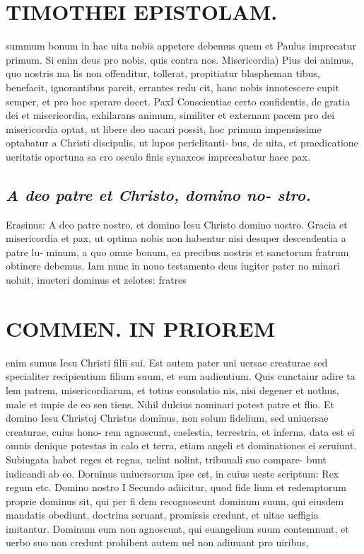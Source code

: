 \documentclass{article}
\begin{document}
\begin{pages}
\section*{TIMOTHEI EPISTOLAM. }
\marginpar{[ p.9 ]}\pstart summum bonum in hac uita nobis appetere debemus quem et Paulus imprecatur primum. Si enim deus pro nobis, quis contra nos.  \pend\pstart Misericordia) Pius dei animus, quo nostris ma lis non offenditur, tollerat, propitiatur blaspheman tibus, benefacit, ignorantibus parcit, errantes redu cit, hanc nobis innotescere cupit semper, et pro hoc sperare docet.  \pend\pstart PaxI Conscientiae certo confidentis, de gratia dei et misericordia, exhilarans animum, similiter et externam pacem pro dei misericordia optat, ut libere deo uacari possit, hoc primum impensissime optabatur a Christi discipulis, ut lupos periclitanti- bus, de uita, et praedicatione ueritatis oportuna sa cro osculo finis synaxcos imprecabatur haec pax.  \pend
{}
{}
\subsection*{\textit{A deo patre et Christo, domino no- stro. }}\pstart Erasinus: A deo patre nostro, et domino Iesu Christo domino uostro.  \pend\pstart Gracia et misericordia et pax, ut optima nobis non habentur nisi desuper descendentia a patre lu- minum, a quo omne bonum, ea precibus nostris et sanctorum fratrum obtinere debemus.  \pend\pstart Iam nunc in nouo testamento deus iugiter pater no minari uoluit, inueteri dominus et zelotes: fratres  \pend
\section*{COMMEN. IN PRIOREM }
\marginpar{[ p.10 ]}\pstart enim sumus Iesu Christi filii sui. Est autem pater uni uersae creaturae sed specialiter recipientium filium suum, et eum audientium. Quis cunctaiur adire ta lem patrem, misericordiarum, et totius consolatio nis, nisi degener et nothus, male et impie de eo sen tiens. Nihil dulcius nominari potest patre et flio.  \pend\pstart Et domino Iesu Christoj Christus dominus, non solum fidelium, sed uniuersae creaturae, cuius hono- rem agnoscunt, caelestia, terrestria, et inferna, data est ei omnis denique potestas in calo et terra, etiam angeli et dominationes ei seruiunt. Subiugata habet reges et regna, uelint nolint, tribunali suo compare- bunt iudicandi ab eo. Doruinus uniuersorum ipse est, in cuius ueste seriptum: Rex regum etc.  \pend\pstart Domino nostro I Secundo adiicitur, quod fide lium et redemptorum proprie dominus sit, qui per fi dem recognoscunt dominum suum, qui eiusdem mandatis obediunt, doctrina seruant, promissis credunt, et uitae ueffigia imitantur. Dominum eum non agnoscunt, qui euangelium suum contemnunt, et uerbo suo non credunt prohibent autem uel non adiuuant pro uiribus,  \pend
{}
{}

\end{pages}
\end{document}
